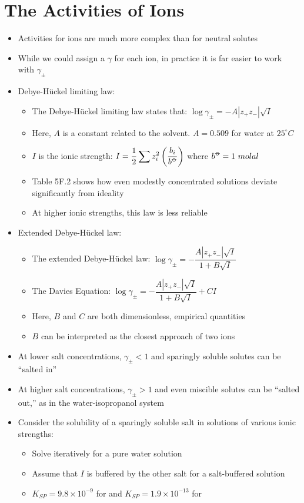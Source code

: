 \documentclass[12pt, openany, letterpaper]{memoir}
\begin{document}
\section{The Activities of Ions}
\begin{itemize}
	\item Activities for ions are much more complex than for neutral solutes
	\item While we could assign a $\gamma$ for each ion, in practice it is far easier to work with $\gamma_{\pm}$
	\item Debye-H\"uckel limiting law:
	      \begin{itemize}
		      \item The Debye-H\"uckel limiting law states that: $\log \gamma_\pm = -A\left|z_+z_-\right|\sqrt{I}$
		      \item Here, $A$ is a constant related to the solvent. $A=0.509$ for water at $25^\circ C$
		      \item $I$ is the ionic strength: $I = \dfrac{1}{2}\displaystyle\sum z_i^2\left(\dfrac{b_i}{b^{\std}}\right)$ where $b^{\std} = 1~molal$
		      \item Table 5F.2 shows how even modestly concentrated solutions deviate significantly from ideality
		      \item At higher ionic strengths, this law is less reliable
	      \end{itemize}
	\item Extended Debye-H\"uckel law:
	      \begin{itemize}
		      \item The extended Debye-H\"uckel law: $\log \gamma_\pm = -\dfrac{A\left|z_+z_-\right|\sqrt{I}}{1+B\sqrt{I}}$
		      \item The Davies Equation: $\log \gamma_\pm = -\dfrac{A\left|z_+z_-\right|\sqrt{I}}{1+B\sqrt{I}} + CI$
		      \item Here, $B$ and $C$ are both dimensionless, empirical quantities
		      \item $B$ can be interpreted as the closest approach of two ions
	      \end{itemize}
	\item At lower salt concentrations, $\gamma_\pm<1$ and sparingly soluble solutes can be ``salted in''
	\item At higher salt concentrations, $\gamma_\pm>1$ and even miscible solutes can be ``salted out,'' as in the water-isopropanol system
	\item Consider the solubility of a sparingly soluble salt in solutions of various ionic strengths:
	      \begin{itemize}
		      \item Solve iteratively for a pure water solution
		      \item Assume that $I$ is buffered by the other salt for a salt-buffered solution
		      \item $K_{SP} = 9.8\times10^{-9}$ for  and $K_{SP} = 1.9\times10^{-13}$ for 
	      \end{itemize}
\end{itemize}
\end{document}
